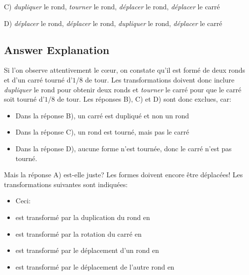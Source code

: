 \documentclass[a4paper,11pt]{report}
\newcommand{\taskGraphicsFolder}{..}
\begin{document}
C) \emph{dupliquer} le rond, \emph{tourner} le rond, \emph{déplacer} le rond, \emph{déplacer} le carré

D) \emph{déplacer} le rond, \emph{déplacer} le rond, \emph{dupliquer} le rond, \emph{déplacer} le carré

\endgroup

\subsection*{Answer Explanation}

Si l’on observe attentivement le cœur, on constate qu’il est formé de deux ronds et d’un carré tourné d’$1$/$8$ de tour. Les transformations doivent donc inclure \emph{dupliquer} le rond pour obtenir deux ronds et \emph{tourner} le carré pour que le carré soit tourné d’$1$/$8$ de tour. Les réponses B), C) et D) sont donc exclues, car:

\begin{itemize}
  \item Dans la réponse B), un carré est dupliqué et non un rond
  \item Dans la réponse C), un rond est tourné, mais pas le carré
  \item Dans la réponse D), aucune forme n’est tournée, donc le carré n’est pas tourné.
\end{itemize}

Mais la réponse A) est-elle juste? Les formes doivent encore être déplacées! Les transformations suivantes sont indiquées:

\begin{itemize}
  \item Ceci: \raisebox{-0.5ex}{}
  \item est transformé par la duplication du rond en \raisebox{-0.5ex}{}
  \item est transformé par la rotation du carré en \raisebox{-0.5ex}{}
  \item est transformé par le déplacement d’un rond en \raisebox{-0.5ex}{}
  \item est transformé par le déplacement de l’autre rond en \raisebox{-0.5ex}{}
\end{itemize}
\end{document}
